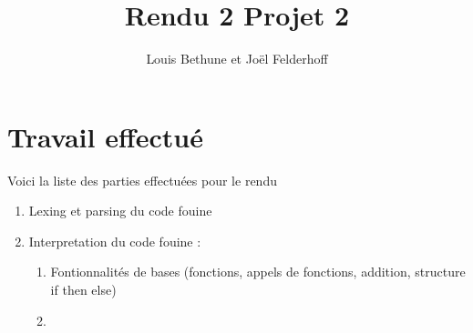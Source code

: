 \documentclass[a4paper,10pt]{report}
\title{Rendu 2 Projet 2}
\author{Louis Bethune et Jo\"el Felderhoff}
\date{}
\begin{document}
\maketitle

\section{Travail effectué}
Voici la liste des parties effectuées pour le rendu
\begin{enumerate}

\item Lexing et parsing du code fouine
\item Interpretation du code fouine :
\begin{enumerate}
	\item Fontionnalités de bases (fonctions, appels de fonctions, addition, structure if then else)
	\item 
\end{enumerate}

\end{enumerate}
\end{document}
